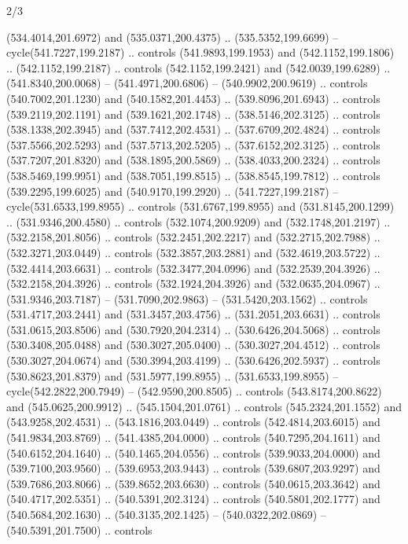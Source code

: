 \begin{flagdescription}{2/3}
\begin{scope}[xshift=0.5\flaglength,yshift=0.5\flagwidth,scale=\flagwidth/495.65]
\begin{scope}[y=0.8pt, x=0.8pt, yscale=-1,shift={(-463.76,-309.78)}]
  (534.4014,201.6972) and (535.0371,200.4375) .. (535.5352,199.6699) --
  cycle(541.7227,199.2187) .. controls (541.9893,199.1953) and
  (542.1152,199.1806) .. (542.1152,199.2187) .. controls (542.1152,199.2421) and
  (542.0039,199.6289) .. (541.8340,200.0068) -- (541.4971,200.6806) --
  (540.9902,200.9619) .. controls (540.7002,201.1230) and (540.1582,201.4453) ..
  (539.8096,201.6943) .. controls (539.2119,202.1191) and (539.1621,202.1748) ..
  (538.5146,202.3125) .. controls (538.1338,202.3945) and (537.7412,202.4531) ..
  (537.6709,202.4824) .. controls (537.5566,202.5293) and (537.5713,202.5205) ..
  (537.6152,202.3125) .. controls (537.7207,201.8320) and (538.1895,200.5869) ..
  (538.4033,200.2324) .. controls (538.5469,199.9951) and (538.7051,199.8515) ..
  (538.8545,199.7812) .. controls (539.2295,199.6025) and (540.9170,199.2920) ..
  (541.7227,199.2187) -- cycle(531.6533,199.8955) .. controls
  (531.6767,199.8955) and (531.8145,200.1299) .. (531.9346,200.4580) .. controls
  (532.1074,200.9209) and (532.1748,201.2197) .. (532.2158,201.8056) .. controls
  (532.2451,202.2217) and (532.2715,202.7988) .. (532.3271,203.0449) .. controls
  (532.3857,203.2881) and (532.4619,203.5722) .. (532.4414,203.6631) .. controls
  (532.3477,204.0996) and (532.2539,204.3926) .. (532.2158,204.3926) .. controls
  (532.1924,204.3926) and (532.0635,204.0967) .. (531.9346,203.7187) --
  (531.7090,202.9863) -- (531.5420,203.1562) .. controls (531.4717,203.2441) and
  (531.3457,203.4756) .. (531.2051,203.6631) .. controls (531.0615,203.8506) and
  (530.7920,204.2314) .. (530.6426,204.5068) .. controls (530.3408,205.0488) and
  (530.3027,205.0400) .. (530.3027,204.4512) .. controls (530.3027,204.0674) and
  (530.3994,203.4199) .. (530.6426,202.5937) .. controls (530.8623,201.8379) and
  (531.5977,199.8955) .. (531.6533,199.8955) -- cycle(542.2822,200.7949) --
  (542.9590,200.8505) .. controls (543.8174,200.8622) and (545.0625,200.9912) ..
  (545.1504,201.0761) .. controls (545.2324,201.1552) and (543.9258,202.4531) ..
  (543.1816,203.0449) .. controls (542.4814,203.6015) and (541.9834,203.8769) ..
  (541.4385,204.0000) .. controls (540.7295,204.1611) and (540.6152,204.1640) ..
  (540.1465,204.0556) .. controls (539.9033,204.0000) and (539.7100,203.9560) ..
  (539.6953,203.9443) .. controls (539.6807,203.9297) and (539.7686,203.8066) ..
  (539.8652,203.6630) .. controls (540.0615,203.3642) and (540.4717,202.5351) ..
  (540.5391,202.3124) .. controls (540.5801,202.1777) and (540.5684,202.1630) ..
  (540.3135,202.1425) -- (540.0322,202.0869) -- (540.5391,201.7500) .. controls

\end{scope}
\end{scope}
\end{flagdescription}
